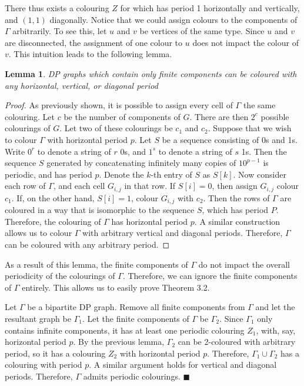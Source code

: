 \documentclass[letterpaper]{article}
\newtheorem{lemma}[theorem]{Lemma}
\renewcommand{\qed}{$\blacksquare$}
\newenvironment{proofof}[1]{\medskip\noindent{\emph{Proof of Theorem #1. }}}{\qed\medskip\\}
\begin{document}
There thus exists a colouring $Z$ for which has period 1 horizontally and vertically, and $(1,1)$ diagonally.
Notice that we could assign colours to the components of $\Gamma$ arbitrarily.
To see this, let $u$ and $v$ be vertices of the same type.
Since $u$ and $v$ are disconnected, the assignment of one colour to $u$ does not impact the colour of $v$.
This intuition leads to the following lemma.

\begin{lemma}
DP graphs which contain only finite components can be coloured with any horizontal, vertical, or diagonal period
\end{lemma}

\begin{proof}
As previously shown, it is possible to assign every cell of $\Gamma$ the same colouring.
Let $c$ be the number of components of $G$.
There are then $2^c$ possible colourings of $G$.
Let two of these colourings be $c_1$ and $c_2$.
Suppose that we wish to colour $\Gamma$ with horizontal period $p$.
Let $S$ be a sequence consisting of 0s and 1s.
Write $0^r$ to denote a string of $r$ 0s, and $1^s$ to denote a string of $s$ 1s.
Then the sequence $S$ generated by concatenating infinitely many copies of $1 0^{p-1}$ is periodic, and has period $p$.
Denote the $k$-th entry of $S$ as $S[k]$.
Now consider each row of $\Gamma$, and each cell $G_{i,j}$ in that row.
If $S[i] = 0$, then assign $G_{i,j}$ colour $c_1$. If, on the other hand, $S[i] = 1$, colour $G_{i,j}$ with $c_2$.
Then the rows of $\Gamma$ are coloured in a way that is isomorphic to the sequence $S$, which has period $P$.
Therefore, the colouring of $\Gamma$ has horizontal period $p$.
A similar construction allows us to colour $\Gamma$ with arbitrary vertical and diagonal periods.
Therefore, $\Gamma$ can be coloured with any arbitrary period.
\end{proof}

As a result of this lemma, the finite components of $\Gamma$ do not impact the overall periodicity of the colourings of $\Gamma$.
Therefore, we can ignore the finite components of $\Gamma$ entirely.
This allows us to easily prove Theorem 3.2.

\begin{proofof}{3.2}
Let $\Gamma$ be a bipartite DP graph.
Remove all finite components from $\Gamma$ and let the resultant graph be $\Gamma_1$.
Let the finite components of $\Gamma$ be $\Gamma_2$.
Since $\Gamma_1$ only contains infinite components, it has at least one periodic colouring $Z_1$, with, say, horizontal period $p$.
By the previous lemma, $\Gamma_2$ can be 2-coloured with arbitrary period, so it has a colouring $Z_2$ with horizontal period $p$.
Therefore, $\Gamma_1 \cup \Gamma_2$ has a colouring with period $p$.
A similar argument holds for vertical and diagonal periods.
Therefore, $\Gamma$ admits periodic colourings.
\end{proofof}
\end{document}
